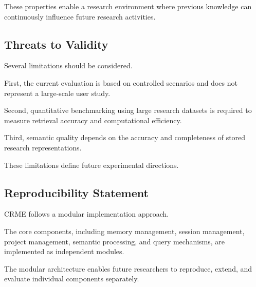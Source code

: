 These properties enable a research environment where previous
knowledge can continuously influence future research activities.



\subsection{Threats to Validity}


Several limitations should be considered.


First, the current evaluation is based on controlled scenarios and
does not represent a large-scale user study.


Second, quantitative benchmarking using large research datasets is
required to measure retrieval accuracy and computational efficiency.


Third, semantic quality depends on the accuracy and completeness of
stored research representations.


These limitations define future experimental directions.



\subsection{Reproducibility Statement}


CRME follows a modular implementation approach.

The core components, including memory management, session management,
project management, semantic processing, and query mechanisms, are
implemented as independent modules.

The modular architecture enables future researchers to reproduce,
extend, and evaluate individual components separately.






